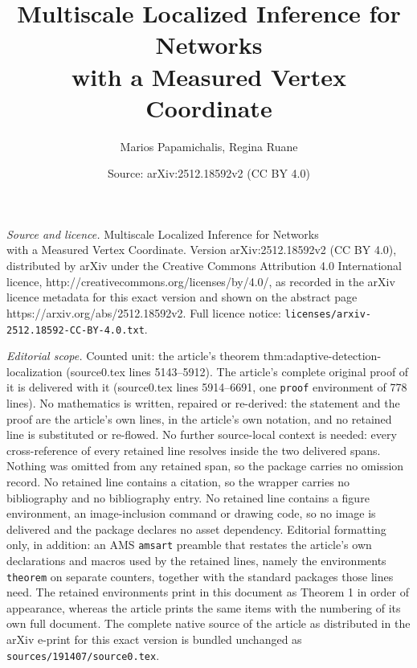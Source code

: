 \documentclass[10pt,a4paper]{amsart}
\title{Multiscale Localized Inference for Networks\\with a Measured Vertex Coordinate}
\author{Marios Papamichalis, Regina Ruane}
\date{Source: arXiv:2512.18592v2 (CC BY 4.0)}
\begin{document}
\maketitle

\noindent\emph{Source and licence.} Multiscale Localized Inference for Networks\\with a Measured Vertex Coordinate. Version arXiv:2512.18592v2 (CC BY 4.0), distributed by arXiv under the Creative Commons Attribution 4.0 International licence, http://creativecommons.org/licenses/by/4.0/, as recorded in the arXiv licence metadata for this exact version and shown on the abstract page https://arxiv.org/abs/2512.18592v2. Full licence notice: \texttt{licenses/arxiv-2512.18592-CC-BY-4.0.txt}.\par\smallskip

\noindent\textit{Editorial scope.} Counted unit: the article's theorem thm:adaptive-detection-localization (source0.tex lines 5143--5912). The article's complete original proof of it is delivered with it (source0.tex lines 5914--6691, one \texttt{proof} environment of 778 lines). No mathematics is written, repaired or re-derived: the statement and the proof are the article's own lines, in the article's own notation, and no retained line is substituted or re-flowed.  No further source-local context is needed: every cross-reference of every retained line resolves inside the two delivered spans.  Nothing was omitted from any retained span, so the package carries no omission record.  No retained line contains a citation, so the wrapper carries no bibliography and no bibliography entry.  No retained line contains a figure environment, an image-inclusion command or drawing code, so no image is delivered and the package declares no asset dependency.  Editorial formatting only, in addition: an AMS \texttt{amsart} preamble that restates the article's own declarations and macros used by the retained lines, namely the environments \texttt{theorem} on separate counters, together with the standard packages those lines need.  The retained environments print in this document as Theorem 1 in order of appearance, whereas the article prints the same items with the numbering of its own full document.  The complete native source of the article as distributed in the arXiv e-print for this exact version is bundled unchanged as \texttt{sources/191407/source0.tex}.
\end{document}
